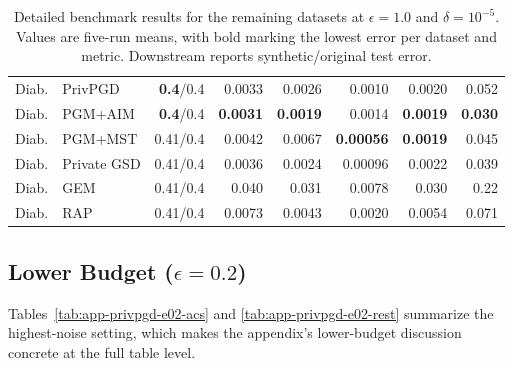 \begin{table}[!tbp]
{\begin{tabular}{llrrrrrr}
    \midrule
    Diab. & PrivPGD & \textbf{0.4}/0.4 & 0.0033 & 0.0026 & 0.0010 & 0.0020 & 0.052 \\
    Diab. & PGM+AIM & \textbf{0.4}/0.4 & \textbf{0.0031} & \textbf{0.0019} & 0.0014 & \textbf{0.0019} & \textbf{0.030} \\
    Diab. & PGM+MST & 0.41/0.4 & 0.0042 & 0.0067 & \textbf{0.00056} & \textbf{0.0019} & 0.045 \\
    Diab. & Private GSD & 0.41/0.4 & 0.0036 & 0.0024 & 0.00096 & 0.0022 & 0.039 \\
    Diab. & GEM & 0.41/0.4 & 0.040 & 0.031 & 0.0078 & 0.030 & 0.22 \\
    Diab. & RAP & 0.41/0.4 & 0.0073 & 0.0043 & 0.0020 & 0.0054 & 0.071 \\
    \bottomrule
  \end{tabular}}
  \caption{Detailed benchmark results for the remaining datasets at \(\epsilon = 1.0\) and \(\delta = 10^{-5}\). Values are five-run means, with bold marking the lowest error per dataset and metric. Downstream reports synthetic/original test error.}
  \label{tab:app-privpgd-e10-rest}
\end{table}

\clearpage
\subsection{Lower Budget (\texorpdfstring{$\epsilon = 0.2$}{epsilon = 0.2})}

Tables~\ref{tab:app-privpgd-e02-acs} and \ref{tab:app-privpgd-e02-rest} summarize the highest-noise setting, which makes the appendix's lower-budget discussion concrete at the full table level.


